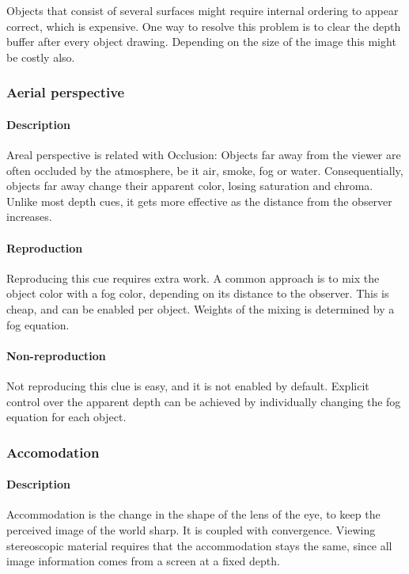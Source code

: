 Objects that consist of several surfaces might require internal ordering to appear correct, which is expensive. One way to resolve this problem is to clear the depth buffer after every object drawing. Depending on the size of the image this might be costly also.


\subsubsection{Aerial perspective}
\paragraph{Description}
Areal perspective is related with Occlusion:
Objects far away from the viewer are often occluded by the atmosphere, be it air, smoke, fog or water.
Consequentially, objects far away change their apparent color, losing saturation and chroma.
Unlike most depth cues, it gets more effective as the distance from the observer increases.

\paragraph{Reproduction}
Reproducing this cue requires extra work. A common approach is to mix the object color with a fog color, depending on its distance to the observer. This is cheap, and can be enabled per object\cite{fog}. Weights of the mixing is determined by a fog equation.

\paragraph{Non-reproduction}
Not reproducing this clue is easy, and it is not enabled by default.
Explicit control over the apparent depth can be achieved by individually changing the fog equation for each object.


\subsubsection{Accomodation}
\paragraph{Description}
Accommodation is the change in the shape of the lens of the eye, to keep the perceived image of the world sharp\cite{accommodation}. It is coupled with convergence. Viewing stereoscopic material requires that the accommodation stays the same, since all image information comes from a screen at a fixed depth.

